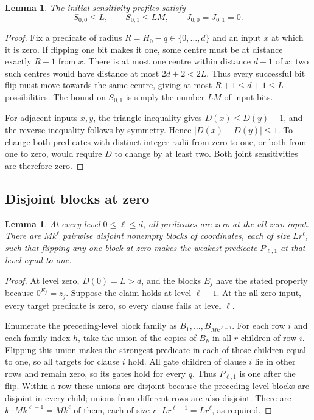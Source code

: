 \documentclass[11pt]{article}
\newtheorem{lemma}[theorem]{Lemma}
\theoremstyle{definition}
\theoremstyle{remark}
\begin{document}
\begin{lemma}\label{lem:base}
The initial sensitivity profiles satisfy
\begin{equation}\label{eq:base-profile}
 S_{0,0}\le L,\qquad S_{0,1}\le LM,\qquad
 J_{0,0}=J_{0,1}=0.
\end{equation}
\end{lemma}
\begin{proof}
Fix a predicate of radius \(R=H_0-q\in\{0,\ldots,d\}\) and an
input \(x\) at which it is zero. If flipping one bit makes it one,
some centre must be at distance exactly \(R+1\) from \(x\).
There is at most one centre within distance \(d+1\) of \(x\):
two such centres would have distance at most \(2d+2<2L\).
Thus every successful bit flip must move towards the same centre,
giving at most \(R+1\le d+1\le L\) possibilities.
The bound on \(S_{0,1}\) is simply the number \(LM\) of input bits.

For adjacent inputs \(x,y\), the triangle inequality gives
\(D(x)\le D(y)+1\), and the reverse inequality follows by symmetry.
Hence \(|D(x)-D(y)|\le1\). To change both predicates with distinct
integer radii from zero to one, or both from one to zero, would require
\(D\) to change by at least two. Both joint sensitivities are therefore
zero.
\end{proof}

\subsection{Disjoint blocks at zero}
\begin{lemma}\label{lem:blocks}
At every level \(0\le\ell\le d\), all predicates are zero at the
all-zero input. There are \(Mk^\ell\) pairwise disjoint nonempty blocks
of coordinates, each of size \(Lr^\ell\), such that flipping any one
block at zero makes the weakest predicate \(P_{\ell,1}\) at that level equal to one.
\end{lemma}
\begin{proof}
At level zero, \(D(0)=L>d\), and the blocks \(E_j\) have the stated
property because \(0^{E_j}=z_j\).
Suppose the claim holds at level \(\ell-1\). At the all-zero input,
every target predicate is zero, so every clause fails at level \(\ell\).

Enumerate the preceding-level block family as
\(B_1,\ldots,B_{Mk^{\ell-1}}\).
For each row \(i\) and each family index \(h\), take the union of the
copies of \(B_h\) in all \(r\) children of row \(i\).
Flipping this union makes the strongest predicate in each of those
children equal to one, so all targets for clause \(i\) hold.
All gate children of clause \(i\) lie in other rows and remain zero,
so its gates hold for every \(q\).
Thus \(P_{\ell,1}\) is one after the flip.
Within a row these unions are disjoint because the preceding-level
blocks are disjoint in every child; unions from different rows are
also disjoint. There are \(k\cdot Mk^{\ell-1}=Mk^\ell\) of them,
each of size \(r\cdot Lr^{\ell-1}=Lr^\ell\), as required.
\end{proof}
\end{document}
